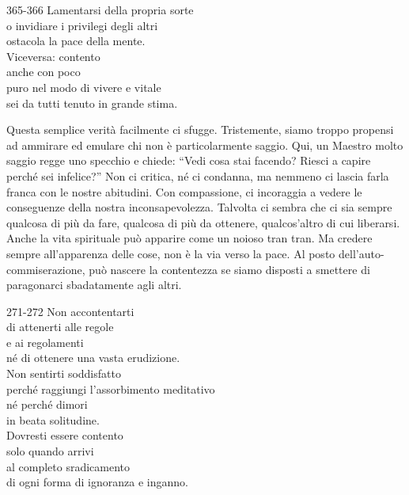 
\begin{dhpVerse}{365-366}
\label{dhp-365}\label{dhp-366}
Lamentarsi della propria sorte\\
o invidiare i privilegi degli altri\\
ostacola la pace della mente.\\
Viceversa: contento\\
anche con poco\\
puro nel modo di vivere e vitale\\
sei da tutti tenuto in grande stima.
\end{dhpVerse}

\begin{dhpRefl}
  Questa semplice verità facilmente ci sfugge. Tristemente, siamo troppo
  propensi ad ammirare ed emulare chi non è particolarmente saggio. Qui, un
  Maestro molto saggio regge uno specchio e chiede: ``Vedi cosa stai facendo?
  Riesci a capire perché sei infelice?'' Non ci critica, né ci condanna, ma
  nemmeno ci lascia farla franca con le nostre abitudini. Con compassione, ci
  incoraggia a vedere le conseguenze della nostra inconsapevolezza. Talvolta ci
  sembra che ci sia sempre qualcosa di più da fare, qualcosa di più da ottenere,
  qualcos'altro di cui liberarsi. Anche la vita spirituale può apparire come un
  noioso tran tran. Ma credere sempre all'apparenza delle cose, non è la via
  verso la pace. Al posto dell'auto-commiserazione, può nascere la contentezza
  se siamo disposti a smettere di paragonarci sbadatamente agli altri.
\end{dhpRefl}


\begin{dhpVerse}{271-272}
\label{dhp-271}\label{dhp-272}
Non accontentarti\\
di attenerti alle regole\\
e ai regolamenti\\
né di ottenere una vasta erudizione.\\
Non sentirti soddisfatto\\
perché raggiungi l'assorbimento meditativo\\
né perché dimori\\
in beata solitudine.\\
Dovresti essere contento\\
solo quando arrivi\\
al completo sradicamento\\
di ogni forma di ignoranza e inganno.
\end{dhpVerse}

